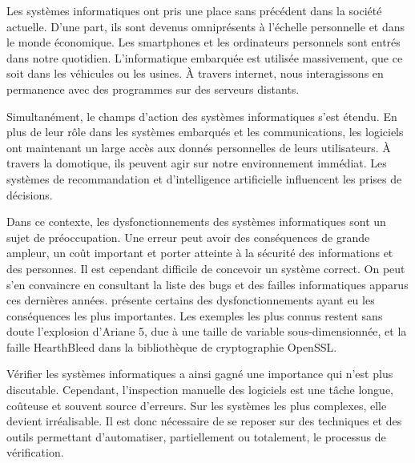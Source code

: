 
\label{sec:Introduction}  %

Les systèmes informatiques ont pris une place sans précédent dans la société
actuelle. D'une part, ils sont devenus omniprésents à l'échelle personnelle et
dans le monde économique. Les smartphones et les ordinateurs personnels sont
entrés dans notre quotidien. L'informatique embarquée est utilisée massivement,
que ce soit dans les véhicules ou les usines. À travers internet, nous
interagissons en permanence avec des programmes sur des serveurs distants.

Simultanément, le champs d'action des systèmes informatiques s'est étendu. En
plus de leur rôle dans les systèmes embarqués et les communications, les
logiciels ont maintenant un large accès aux donnés personnelles de leurs
utilisateurs. À travers la domotique, ils peuvent agir sur notre environnement
immédiat. Les systèmes de recommandation et d'intelligence artificielle
influencent les prises de décisions.

Dans ce contexte, les dysfonctionnements des systèmes informatiques sont un
sujet de préoccupation. Une erreur peut avoir des conséquences de grande
ampleur, un coût important et porter atteinte à la sécurité des informations et
des personnes. Il est cependant difficile de concevoir un système correct. On
peut s'en convaincre en consultant la liste des bugs et des failles
informatiques apparus ces dernières années. \cite{horror_story} présente
certains des dysfonctionnements ayant eu les conséquences les plus importantes.
Les exemples les plus connus restent sans doute l'explosion d'Ariane 5, due à
une taille de variable sous-dimensionnée, et la faille HearthBleed dans la
bibliothèque de cryptographie OpenSSL.

Vérifier les systèmes informatiques a ainsi gagné une importance qui n'est
plus discutable. Cependant, l'inspection manuelle des logiciels est une
tâche longue, coûteuse et souvent source d'erreurs. Sur les systèmes les
plus complexes, elle devient irréalisable. Il est donc nécessaire de se
reposer sur des techniques et des outils permettant d'automatiser,
partiellement ou totalement, le processus de vérification.

